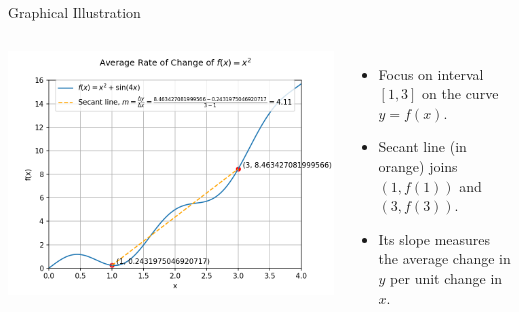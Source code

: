 \documentclass{beamer}
\begin{document}
\begin{frame}{Graphical Illustration}
  \begin{columns}
      \includegraphics[width=\textwidth]{figures/avg_rate_of_change.png}
      \begin{itemize}
        \item Focus on interval $[1,3]$ on the curve $y=f(x)$.
        \item Secant line (in orange) joins $(1,f(1))$ and $(3,f(3))$.
        \item Its slope measures the average change in $y$ per unit change in $x$.
      \end{itemize}
  \end{columns}
\end{frame}
\end{document}

